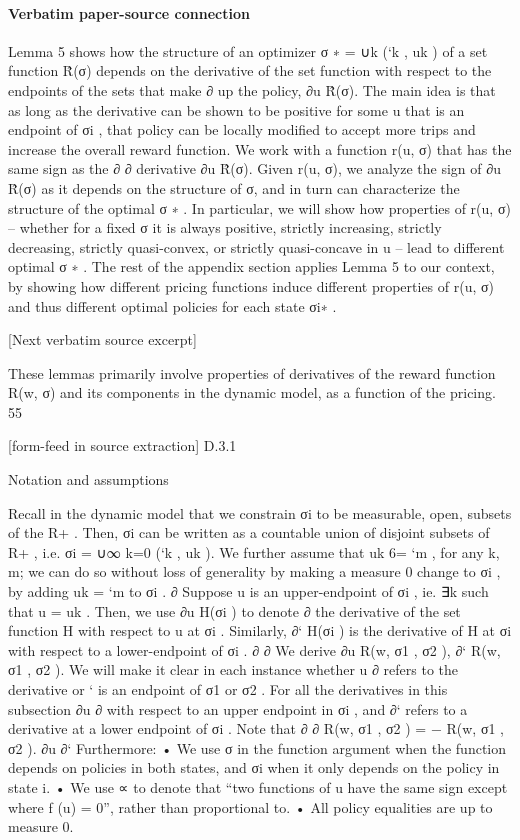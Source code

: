 \documentclass[10pt]{article}
\begin{document}
\paragraph{Verbatim paper-source connection}
\begin{ReviewVerbatim}
Lemma 5 shows how the structure of an optimizer σ ∗ = ∪k (`k , uk ) of a set function R̂(σ)
depends on the derivative of the set function with respect to the endpoints of the sets that make
∂
up the policy, ∂u
R̂(σ). The main idea is that as long as the derivative can be shown to be positive
for some u that is an endpoint of σi , that policy can be locally modified to accept more trips and
increase the overall reward function. We work with a function r(u, σ) that has the same sign as the
∂
∂
derivative ∂u
R̂(σ). Given r(u, σ), we analyze the sign of ∂u
R̂(σ) as it depends on the structure of
σ, and in turn can characterize the structure of the optimal σ ∗ .
In particular, we will show how properties of r(u, σ) – whether for a fixed σ it is always positive,
strictly increasing, strictly decreasing, strictly quasi-convex, or strictly quasi-concave in u – lead to
different optimal σ ∗ . The rest of the appendix section applies Lemma 5 to our context, by showing
how different pricing functions induce different properties of r(u, σ) and thus different optimal
policies for each state σi∗ .

[Next verbatim source excerpt]

These lemmas primarily involve properties of derivatives of the reward function R(w, σ) and its
components in the dynamic model, as a function of the pricing.
55


[form-feed in source extraction]
D.3.1

Notation and assumptions

Recall in the dynamic model that we constrain σi to be measurable, open, subsets of the R+ . Then,
σi can be written as a countable union of disjoint subsets of R+ , i.e. σi = ∪∞
k=0 (`k , uk ). We further
assume that uk 6= `m , for any k, m; we can do so without loss of generality by making a measure 0
change to σi , by adding uk = `m to σi .
∂
Suppose u is an upper-endpoint of σi , ie. ∃k such that u = uk . Then, we use ∂u
H(σi ) to denote
∂
the derivative of the set function H with respect to u at σi . Similarly, ∂` H(σi ) is the derivative of
H at σi with respect to a lower-endpoint of σi .
∂
∂
We derive ∂u
R(w, {σ1 , σ2 }), ∂`
R(w, {σ1 , σ2 }). We will make it clear in each instance whether u
∂
refers to the derivative
or ` is an endpoint of σ1 or σ2 . For all the derivatives in this subsection ∂u
∂
with respect to an upper endpoint in σi , and ∂` refers to a derivative at a lower endpoint of σi .
Note that
∂
∂
R(w, {σ1 , σ2 }) = − R(w, {σ1 , σ2 }).
∂u
∂`
Furthermore:
• We use σ in the function argument when the function depends on policies in both states, and
σi when it only depends on the policy in state i.
• We use ∝ to denote that “two functions of u have the same sign except where f (u) = 0”,
rather than proportional to.
• All policy equalities are up to measure 0.
\end{ReviewVerbatim}
\end{document}

